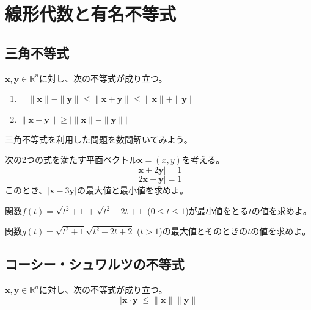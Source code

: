 \documentclass{jlreq}
\begin{document}
\section{線形代数と有名不等式}
\subsection{三角不等式}
\begin{theorembox}[三角不等式]
	$\boldsymbol{x}, \boldsymbol{y} \in \mathbb{R}^n$に対し、次の不等式が成り立つ。
	\begin{enumerate}
		\item 　$\| \boldsymbol{x} \| - \| \boldsymbol{y} \| \leq \| \boldsymbol{x} + \boldsymbol{y} \| \leq \| \boldsymbol{x} \| + \| \boldsymbol{y} \|$
		\item $\| \boldsymbol{x} - \boldsymbol{y} \| \geq | \| \boldsymbol{x} \| - \| \boldsymbol{y} \| |$
	\end{enumerate}
\end{theorembox}

三角不等式を利用した問題を数問解いてみよう。

\begin{problem}
	次の2つの式を満たす平面ベクトル$\boldsymbol{x} = (x, y)$を考える。
	\begin{equation*}
		|\boldsymbol{x} + 2\boldsymbol{y}| = 1
	\end{equation*}	
	\begin{equation*}
		|2\boldsymbol{x} + \boldsymbol{y}| = 1
	\end{equation*}
	このとき、$|\boldsymbol{x} - 3 \boldsymbol{y}|$の最大値と最小値を求めよ。
\end{problem}

\begin{problem}
	関数$f(t) = \sqrt{t^2 + 1} + \sqrt{t^2 - 2t + 1}$ ($0 \leq t \leq 1$)が最小値をとる$t$の値を求めよ。
\end{problem}

\begin{problem}
	関数$g(t) = \sqrt{t^2 + 1}  \sqrt{t^2 - 2 t + 2}$ ($t > 1$)の最大値とそのときの$t$の値を求めよ。
\end{problem}

\subsection{コーシー・シュワルツの不等式}

\begin{theorembox}
	$\boldsymbol{x}, \boldsymbol{y} \in \mathbb{R}^n$に対し、次の不等式が成り立つ。
	\begin{equation*}
		| \boldsymbol{x} \cdot \boldsymbol{y} | \leq \| \boldsymbol{x} \| \| \boldsymbol{y} \|
	\end{equation*}
\end{theorembox}
\end{document}
